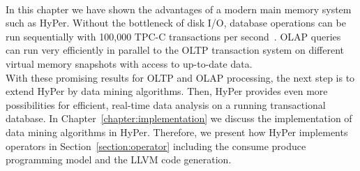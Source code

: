 \\
In this chapter we have shown the advantages of a modern main memory system such as HyPer. Without the bottleneck of disk I/O, database operations can be run sequentially with 100,000 TPC-C transactions per second~\parencite{brawnywimpy}. OLAP queries can run very efficiently in parallel to the OLTP transaction system on different virtual memory snapshots with access to up-to-date data. 
\\
With these promising results for OLTP and OLAP processing, the next step is to extend HyPer by data mining algorithms. Then, HyPer provides even more possibilities for efficient, real-time data analysis on a running transactional database. In Chapter~\ref{chapter:implementation} we discuss the implementation of data mining algorithms in HyPer. Therefore, we present how HyPer implements operators in Section~\ref{section:operator} including the consume produce programming model and the LLVM code generation. 



